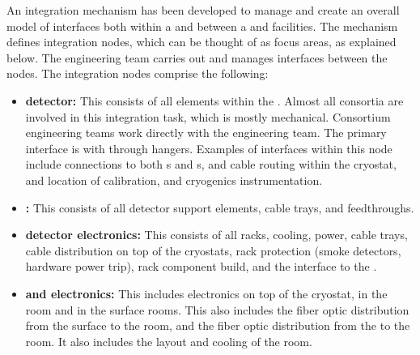 An integration mechanism has been developed to manage and create an
overall model of interfaces both within a  and
between a  and facilities. The mechanism defines
integration nodes, which can be thought of as focus areas, as
explained below.  The  engineering team carries out and
manages interfaces between the nodes. The integration nodes comprise the following:
\begin{itemize}
\item {\bf detector:} This consists of all  elements within
  the . Almost all consortia are involved in this
  integration task, which is mostly mechanical. Consortium engineering
  teams work directly with the  engineering team.  The
  primary interface is with  through hangers. Examples of
  interfaces within this node include   connections to both
  s and s,  and  cable
  routing within the cryostat, and location of calibration, and
  cryogenics instrumentation.
\item {\bf {}:} This consists of all detector support elements,
  cable trays, and feedthroughs.
\item {\bf detector electronics:} This consists of all racks, cooling,
  power, cable trays, cable distribution on top of the cryostats, rack
  protection (smoke detectors, hardware power trip), rack component
  build, and the interface to the .
\item {\bf {} and electronics:} This includes electronics on
  top of the cryostat, in the  room and in the surface
  rooms. This also includes the fiber optic distribution from the
  surface to the  room, and the fiber optic distribution
  from the  to the  room. It also includes the
  layout and cooling of the  room.
\end{itemize}

